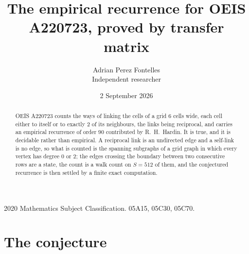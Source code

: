 \documentclass[11pt,a4paper]{article}
\title{The empirical recurrence for OEIS A220723, proved by transfer matrix}
\author{Adrian Perez Fontelles\\ \small Independent researcher}
\date{2 September 2026}
\theoremstyle{plain}
\theoremstyle{definition}
\begin{document}
\maketitle

\begin{abstract}
OEIS A220723 counts the ways of linking the cells of a grid $6$ cells wide, each cell either to
itself or to exactly $2$ of its neighbours, the links being reciprocal, and carries an
empirical recurrence of order $90$ contributed by R.~H.~Hardin. It is true, and it is
decidable rather than empirical. A reciprocal link is an undirected edge and a self-link is
no edge, so what is counted is the spanning subgraphs of a grid graph in which every vertex
has degree $0$ or $2$; the edges crossing the boundary between two consecutive rows are a
state, the count is a walk count on $S=512$ of them, and the conjectured recurrence is then
settled by a finite exact computation.
\end{abstract}

\noindent\small 2020 Mathematics Subject Classification. 05A15, 05C30, 05C70.\normalsize

\section{The conjecture}
\end{document}
